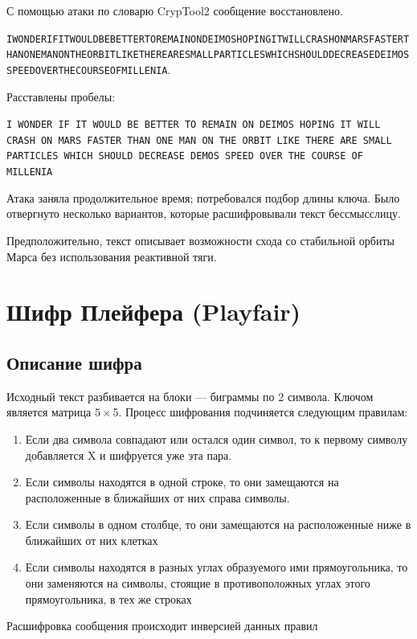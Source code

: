 \documentclass[a4paper, 14pt]{extarticle}
\begin{document}
\begin{enumerate}
    С помощью атаки по словарю CrypTool2 сообщение восстановлено.

    \texttt{IWONDERIFITWOULDBEBETTERTOREMAINONDEIMOSHOPINGITWILLCRASHONMARSFASTERTHANONEMANONTHEORBITLIKETHEREARESMALLPARTICLESWHICHSHOULDDECREASEDEIMOSSPEEDOVERTHECOURSEOFMILLENIA}.

    Расставлены пробелы:

    \texttt{I WONDER IF IT WOULD BE BETTER TO REMAIN ON DEIMOS HOPING IT WILL CRASH ON MARS FASTER THAN ONE MAN ON THE ORBIT LIKE THERE ARE SMALL PARTICLES WHICH SHOULD DECREASE DEMOS SPEED OVER THE COURSE OF MILLENIA} 

    Атака заняла продолжительное время; потребовался подбор длины ключа. Было отвергнуто несколько вариантов, которые расшифровывали текст бессмысслицу.

    Предположительно, текст описывает возможности схода со стабильной орбиты Марса без использования реактивной тяги.

\end{enumerate}

\FloatBarrier{}
\section{Шифр Плейфера (Playfair)}

\subsection{Описание шифра}
Исходный текст разбивается на блоки --- биграммы по 2 символа. Ключом является матрица $5\times$5.
Процесс шифрования подчиняется следующим правилам:
\begin{enumerate}
    \item Если два символа совпадают или остался один символ, то к первому символу добавляется X и шифруется уже эта пара.
    \item Если символы находятся в одной строке, то они замещаются на расположенные в ближайших от них справа символы.
    \item Если символы в одном столбце, то они замещаются на расположенные ниже в ближайших от них клетках
    \item Если символы находятся в разных углах образуемого ими прямоугольника, то они заменяются на символы, стоящие в противоположных углах этого прямоугольника, в тех же строках\\
\end{enumerate}

Расшифровка сообщения происходит инверсией данных правил
\end{document}
